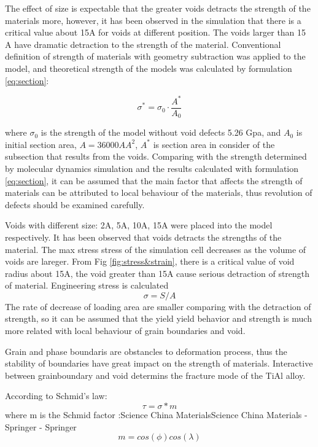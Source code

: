 \documentclass[materials,article,submit,moreauthors,pdftex,10pt,a4paper]{Definitions/mdpi}
\begin{document}
The effect of size is expectable that the greater voids detracts the strength of the materials more, however, it has been observed in the simulation that there is a critical value about 15A for voids at different position. The voids larger than 15 A have dramatic detraction to the strength of the material. Conventional definition of strength of materials with geometry subtraction was applied to the model, and theoretical strength of the models was calculated by formulation \ref{eq:section}:
	
	\begin{equation} \label{eq:section} 
	\sigma^* = \sigma_0 \cdot \frac{A^*}{A_0}
	\end{equation}
	
where $\sigma_0$ is the strength of the model without void defects 5.26 Gpa, and $A_0$ is initial section area, $ A = 36000 {AA}^2$, $A^* $ is section area in consider of the subsection that results from the voids. Comparing with the strength determined by molecular dynamics simulation and the results calculated with formulation \ref{eq:section}, it can be assumed that the main factor that affects the strength of materials can be attributed to local behaviour of the materials, thus revolution of defects should be examined carefully.

	
Voids with different size: 2A, 5A, 10A, 15A were placed into the model respectively. It has been observed that voids detracts the strengths of the material. The max stress stress of the simulation cell decreases as the volume of voids are lareger. From Fig \ref{fig:stress&strain}, there is a critical value of void radius about 15A, the void greater than 15A cause serious detraction of strength of material. 
Engineering stress is calculated
	$$ \sigma = S/A$$
The rate of decrease of loading area are smaller comparing with the detraction of strength, so it can be assumed that the yield yield behavior and strength is much more related with local behaviour of grain boundaries and void.
	
Grain and phase boundaris are obstancles to deformation process, thus the stability of boundaries have great impact on the strength of materials. Interactive between grainboundary and void determins the fracture mode of the TiAl alloy.
	
According to Schmid's law:
	$$\tau = \sigma*m$$
where m is the Schmid factor :Science China MaterialsScience China Materials - Springer - Springer
	$$ m = cos(\phi)cos(\lambda)$$


\end{document}
